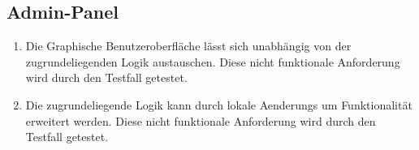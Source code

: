 \subsection*{Admin-Panel}

\begin{samepage}
    \begin{enumerate}[label=\textbf{/NFW\arabic*0/}, align=left, start=3]
        \item \label{/NFW30/} Die Graphische Benutzeroberfläche lässt sich unabhängig von der zugrundeliegenden Logik austauschen. Diese nicht funktionale Anforderung wird durch den Testfall  getestet.
        \item \label{/NFW40/} Die zugrundeliegende Logik kann durch \glspl{lokale Aenderung} um Funktionalität erweitert werden. Diese nicht funktionale Anforderung wird durch den Testfall  getestet.
    \end{enumerate}
\end{samepage}